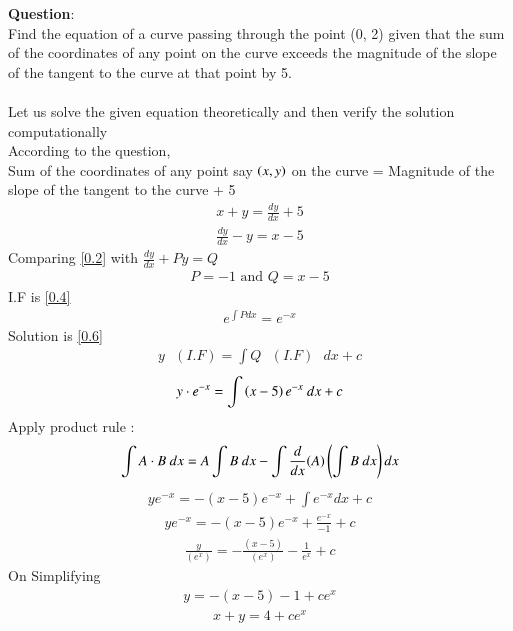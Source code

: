 \documentclass[journal]{IEEEtran}
\begin{document}
\textbf{Question}:\\
Find the equation of a curve passing through the point (0, 2) given that the sum of the coordinates of any point on the curve exceeds the magnitude of the slope of the tangent to the curve at that point by 5. \\ 
\solution \\
Let us solve the given equation theoretically and then verify the solution computationally \\
According to the question, \\
Sum of the coordinates of any point say $\left(x,y\right)$ on the curve = Magnitude of the slope of the tangent to the curve + 5 
\begin{align}
    x+y = \frac{dy}{dx} + 5 
\end{align}
\begin{align}
    \frac{dy}{dx} - y= x-5
    \label{0.2}
\end{align}
Comparing \ref{0.2} with $\frac{dy}{dx} + Py = Q$
\begin{align}
    P=-1 \text{ and } Q=x-5
\end{align}
I.F is \ref{0.4}
\begin{align}
    e^{\int P dx} = e^ {-x}
    \label{0.4}
\end{align}
Solution is \ref{0.6}
\begin{align}
    y\text{ }(I.F) = \int Q\text{ }(I.F)\text{ }dx + c 
\end{align}
\begin{align}
    y \cdot e^{-x} = \int \left(x-5\right) e^{-x} \text{ }dx +c 
    \label{0.6}
\end{align}
Apply product rule :
\begin{align}
    \int A\cdot B \text{ }dx = A \int B \text{ }dx - \int \frac{d}{dx}(A)\left(\int B \text{ }dx\right)dx
\end{align}
\begin{align}
     y e^{-x} = - (x-5)e^{-x} + \int e^{-x}  dx + c
 \end{align}
\begin{align}
     y e^{-x} = - (x-5)e^{-x} + \frac{e^{-x}}{-1} + c 
\end{align}
\begin{align}
     \frac{y}{(e^x)}= - \frac{(x-5)}{(e^{x})} - \frac{1}{e^x} + c
\end{align}
On Simplifying 
\begin{align}
     y = - (x-5) - 1 +c e^x
\end{align}
\begin{align}
    x+y = 4 + c e^x
    \label{0.12}
\end{align}
\end{document}
